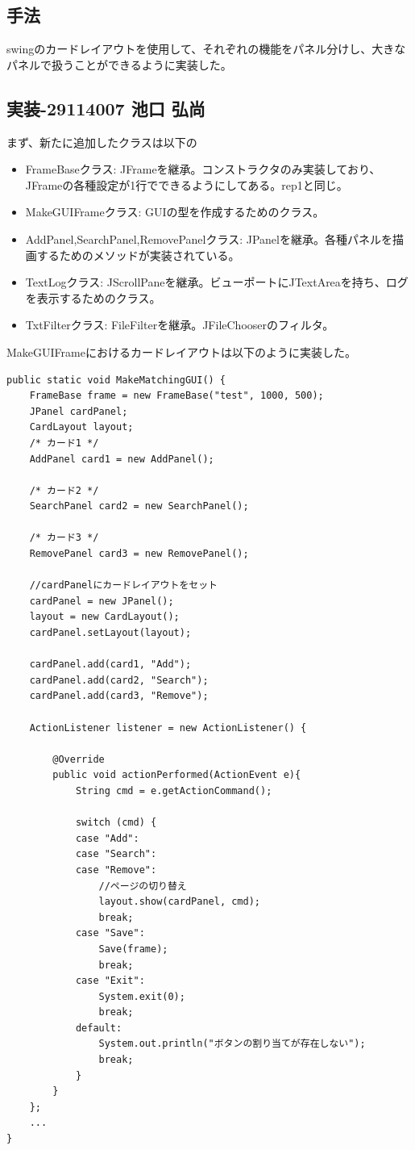 \documentclass{jarticle}
\begin{document}
\subsection{手法}
swingのカードレイアウトを使用して、それぞれの機能をパネル分けし、大きなパネルで扱うことができるように実装した。

\subsection{実装-29114007 池口 弘尚}
まず、新たに追加したクラスは以下の
\begin{itemize}
\item FrameBaseクラス: JFrameを継承。コンストラクタのみ実装しており、JFrameの各種設定が1行でできるようにしてある。rep1と同じ。
\item MakeGUIFrameクラス: GUIの型を作成するためのクラス。
\item AddPanel,SearchPanel,RemovePanelクラス: JPanelを継承。各種パネルを描画するためのメソッドが実装されている。
\item TextLogクラス: JScrollPaneを継承。ビューポートにJTextAreaを持ち、ログを表示するためのクラス。
\item TxtFilterクラス: FileFilterを継承。JFileChooserのフィルタ。
\end{itemize}

MakeGUIFrameにおけるカードレイアウトは以下のように実装した。


\begin{lstlisting}[caption=GUI作成,label=src:MakeGUIFrame]
public static void MakeMatchingGUI() {
	FrameBase frame = new FrameBase("test", 1000, 500);
	JPanel cardPanel;
	CardLayout layout;
	/* カード1 */
	AddPanel card1 = new AddPanel();

	/* カード2 */
	SearchPanel card2 = new SearchPanel();

	/* カード3 */
	RemovePanel card3 = new RemovePanel();

	//cardPanelにカードレイアウトをセット
	cardPanel = new JPanel();
	layout = new CardLayout();
	cardPanel.setLayout(layout);

	cardPanel.add(card1, "Add");
	cardPanel.add(card2, "Search");
	cardPanel.add(card3, "Remove");

	ActionListener listener = new ActionListener() {

		@Override
		public void actionPerformed(ActionEvent e){
			String cmd = e.getActionCommand();

			switch (cmd) {
			case "Add":
			case "Search":
			case "Remove":
            	//ページの切り替え
				layout.show(cardPanel, cmd);
				break;
			case "Save":
				Save(frame);
				break;
			case "Exit":
				System.exit(0);
				break;
			default:
				System.out.println("ボタンの割り当てが存在しない");
				break;
			}
		}
	};
    ...
}
\end{lstlisting}
\end{document}
